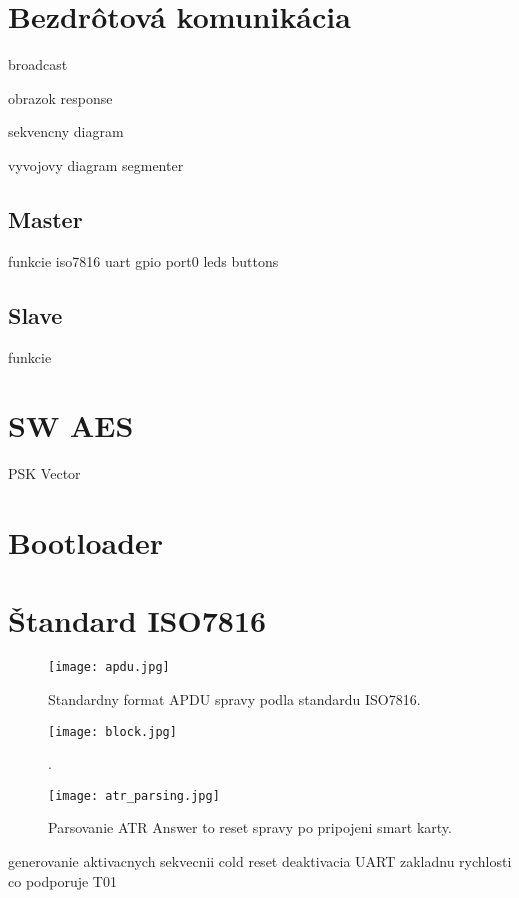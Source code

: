\documentclass[12pt,a4wide,oneside,openright]{report}
\begin{document}
\section{Bezdrôtová komunikácia}
broadcast
 
obrazok response

	sekvencny diagram

	vyvojovy diagram
segmenter

\subsection{Master}
funkcie
iso7816 uart gpio port0
leds
buttons

\subsection{Slave}
funkcie


\section{SW AES}
PSK
Vector

\section{Bootloader}

\section{Štandard ISO7816}

	\begin{figure*}[h]
		\centering
		\texttt{[image: apdu.jpg]}
		\caption{Standardny format APDU spravy podla standardu ISO7816\cite{smartcard}.}
		\label{f:apdu}
	\end{figure*}
	
	\begin{figure*}[h]
		\centering
		\texttt{[image: block.jpg]}
		\caption{\cite{SmartCardTutorial}.}
		\label{f:tpdu}
	\end{figure*}


	\begin{figure*}[h]
		\centering
		\texttt{[image: atr\_parsing.jpg]}
		\caption{Parsovanie ATR Answer to reset spravy po pripojeni smart karty\cite{smartcard}.}
		\label{f:apdu}
	\end{figure*}

generovanie aktivacnych sekvecnii cold reset
deaktivacia
UART
zakladnu
rychlosti 
co podporuje
T01
\end{document}
